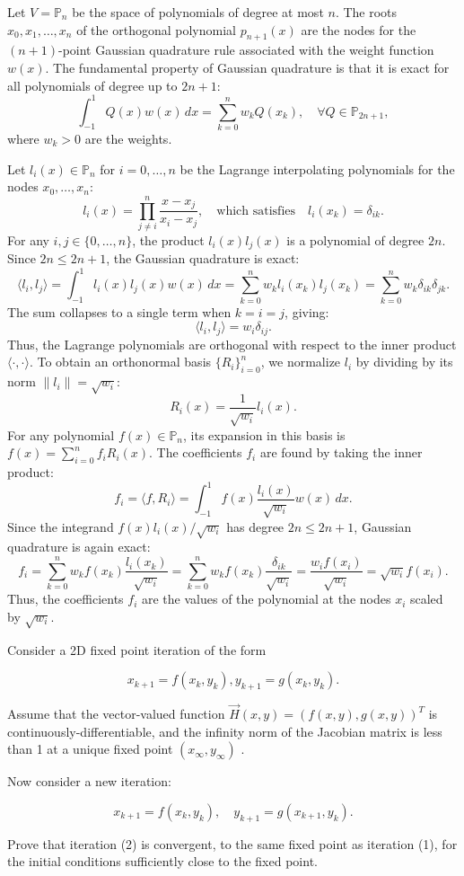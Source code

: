 \begin{solution}
Let $V = \mathbb{P}_n$ be the space of polynomials of degree at most $n$. The roots $x_0, x_1, \dots, x_n$ of the orthogonal polynomial $p_{n+1}(x)$ are the nodes for the $(n+1)$-point Gaussian quadrature rule associated with the weight function $w(x)$. The fundamental property of Gaussian quadrature is that it is exact for all polynomials of degree up to $2n+1$:
\[ \int_{-1}^{1} Q(x) w(x) \, dx = \sum_{k=0}^{n} w_k Q(x_k), \quad \forall Q \in \mathbb{P}_{2n+1}, \]
where $w_k > 0$ are the weights.

Let $l_i(x) \in \mathbb{P}_n$ for $i=0, \dots, n$ be the Lagrange interpolating polynomials for the nodes $x_0, \dots, x_n$:
\[ l_i(x) = \prod_{j \neq i}^n \frac{x-x_j}{x_i-x_j}, \quad \text{which satisfies} \quad l_i(x_k) = \delta_{ik}. \]
For any $i, j \in \{0, \dots, n\}$, the product $l_i(x)l_j(x)$ is a polynomial of degree $2n$. Since $2n \leq 2n+1$, the Gaussian quadrature is exact:
\[ \langle l_i, l_j \rangle = \int_{-1}^{1} l_i(x)l_j(x)w(x) \, dx = \sum_{k=0}^{n} w_k l_i(x_k) l_j(x_k) = \sum_{k=0}^{n} w_k \delta_{ik} \delta_{jk}. \]
The sum collapses to a single term when $k=i=j$, giving:
\[ \langle l_i, l_j \rangle = w_i \delta_{ij}. \]
Thus, the Lagrange polynomials are orthogonal with respect to the inner product $\langle \cdot, \cdot \rangle$. To obtain an orthonormal basis $\{R_i\}_{i=0}^n$, we normalize $l_i$ by dividing by its norm $\|l_i\| = \sqrt{w_i}$:
\[ R_i(x) = \frac{1}{\sqrt{w_i}} l_i(x). \]
For any polynomial $f(x) \in \mathbb{P}_n$, its expansion in this basis is $f(x) = \sum_{i=0}^n f_i R_i(x)$. The coefficients $f_i$ are found by taking the inner product:
\[ f_i = \langle f, R_i \rangle = \int_{-1}^{1} f(x) \frac{l_i(x)}{\sqrt{w_i}} w(x) \, dx. \]
Since the integrand $f(x)l_i(x)/\sqrt{w_i}$ has degree $2n \leq 2n+1$, Gaussian quadrature is again exact:
\[ f_i = \sum_{k=0}^n w_k f(x_k) \frac{l_i(x_k)}{\sqrt{w_i}} = \sum_{k=0}^n w_k f(x_k) \frac{\delta_{ik}}{\sqrt{w_i}} = \frac{w_i f(x_i)}{\sqrt{w_i}} = \sqrt{w_i} f(x_i). \]
Thus, the coefficients $f_i$ are the values of the polynomial at the nodes $x_i$ scaled by $\sqrt{w_i}$.
\end{solution}

\begin{exercise}
\label{applied:2022:2}
Consider a 2D fixed point iteration of the form

\[
x _ {k + 1} = f \left(x _ {k}, y _ {k}\right), y _ {k + 1} = g \left(x _ {k}, y _ {k}\right). \tag {1}
\]

Assume that the vector-valued function $\vec { H } ( x , y ) = ( f ( x , y ) , g ( x , y ) ) ^ { T }$ is continuously-differentiable, and the infinity norm of the Jacobian matrix is less than 1 at a unique fixed point $( x _ { \infty } , y _ { \infty } )$ .

Now consider a new iteration:

\[
x _ {k + 1} = f \left(x _ {k}, y _ {k}\right), \quad y _ {k + 1} = g \left(x _ {k + 1}, y _ {k}\right). \tag {2}
\]

Prove that iteration (2) is convergent, to the same fixed point as iteration (1), for the initial conditions sufficiently close to the fixed point.
\end{exercise}

